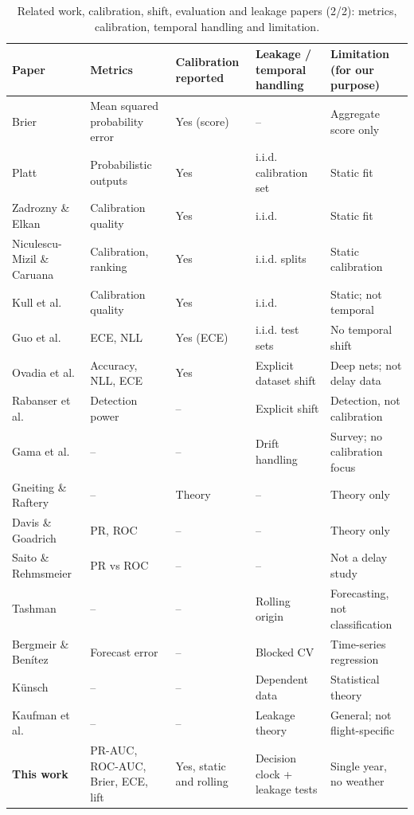 \documentclass[conference]{IEEEtran}
\newcommand{\tabsize}{\footnotesize}
\begin{document}
\begin{table}[!t]
\caption[Related work: calibration, shift and leakage evaluation.]{Related work, calibration, shift, evaluation and leakage papers (2/2): metrics, calibration, temporal handling and limitation.}
\label{tab:rw2b}
\centering\tabsize
\begin{tabular}{@{}P{3.0cm}P{2.6cm}P{1.9cm}P{3.0cm}P{4.3cm}@{}}
\toprule
Paper & Metrics & Calibration reported & Leakage / temporal handling & Limitation (for our purpose)\\
\midrule
Brier & Mean squared probability error & Yes (score) & -- & Aggregate score only\\
Platt & Probabilistic outputs & Yes & i.i.d. calibration set & Static fit\\
Zadrozny \& Elkan & Calibration quality & Yes & i.i.d. & Static fit\\
Niculescu-Mizil \& Caruana & Calibration, ranking & Yes & i.i.d. splits & Static calibration\\
Kull et al. & Calibration quality & Yes & i.i.d. & Static; not temporal\\
Guo et al. & ECE, NLL & Yes (ECE) & i.i.d. test sets & No temporal shift\\
Ovadia et al. & Accuracy, NLL, ECE & Yes & Explicit dataset shift & Deep nets; not delay data\\
Rabanser et al. & Detection power & -- & Explicit shift & Detection, not calibration\\
Gama et al. & -- & -- & Drift handling & Survey; no calibration focus\\
Gneiting \& Raftery & -- & Theory & -- & Theory only\\
Davis \& Goadrich & PR, ROC & -- & -- & Theory only\\
Saito \& Rehmsmeier & PR vs ROC & -- & -- & Not a delay study\\
Tashman & -- & -- & Rolling origin & Forecasting, not classification\\
Bergmeir \& Ben\'itez & Forecast error & -- & Blocked CV & Time-series regression\\
K\"unsch & -- & -- & Dependent data & Statistical theory\\
Kaufman et al. & -- & -- & Leakage theory & General; not flight-specific\\
\textbf{This work} & PR-AUC, ROC-AUC, Brier, ECE, lift & Yes, static and rolling & Decision clock + leakage tests & Single year, no weather\\
\bottomrule
\end{tabular}
\end{table}
\end{document}
